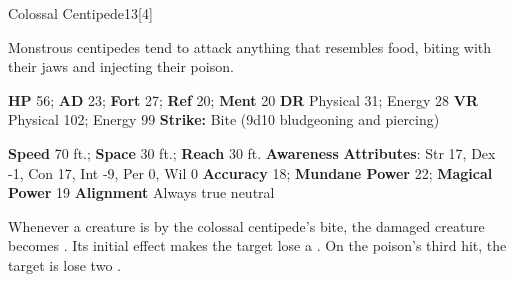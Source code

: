   
  \begin{monsection}{Colossal Centipede}{13}[4]
    \vspace{-1em}\vspace{-1em}
    \vspace{0em}

    
    Monstrous centipedes tend to attack anything that resembles food, biting with their jaws and injecting their poison.
  
    

    \begin{spellcontent}
      \begin{spelltargetinginfo}
        \pari \textbf{HP} 56;
          \textbf{AD} 23;
          \textbf{Fort} 27;
          \textbf{Ref} 20;
          \textbf{Ment} 20
        \pari \textbf{DR} Physical 31; Energy 28
        \pari \textbf{VR} Physical 102; Energy 99
        \pari \textbf{Strike:}
            Bite  (9d10 bludgeoning and piercing)
      \end{spelltargetinginfo}
    \end{spellcontent}
    \begin{monsterfooter}
      \pari \textbf{Speed} 70 ft.;
        \textbf{Space} 30 ft.;
        \textbf{Reach} 30 ft.
      \pari \textbf{Awareness} 
      \pari \textbf{Attributes}:
        Str 17, Dex -1,
        Con 17, Int -9,
        Per 0, Wil 0
      \pari \textbf{Accuracy} 18;
        \textbf{Mundane Power} 22;
      \textbf{Magical Power} 19
      \pari \textbf{Alignment} Always true neutral
    \end{monsterfooter}
  \end{monsection}
    Whenever a creature is  by the colossal centipede's bite,
      the damaged creature becomes .
    Its initial effect makes the target lose a .
    On the poison's third hit, the target is lose two .
  
